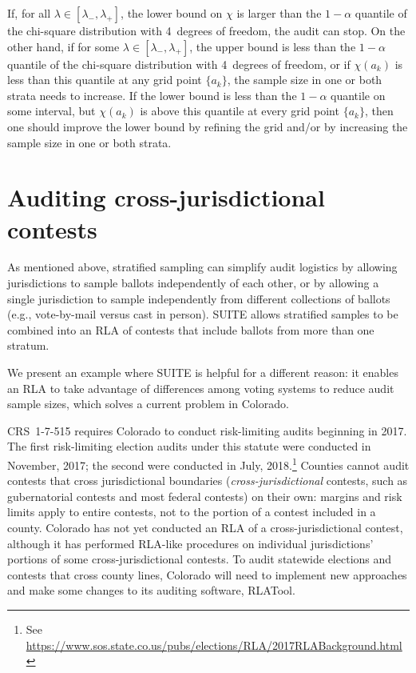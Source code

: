 \documentclass[runningheads]{llncs}
\begin{document}
If, for all $\lambda \in [\lambda_-, \lambda_+]$, the lower bound on $\chi$
is larger than the $1-\alpha$ quantile of the chi-square distribution with 4~degrees of freedom,
the audit can stop.
On the other hand, if for some $\lambda \in [\lambda_-, \lambda_+]$, 
the upper bound is less than the $1-\alpha$ quantile of the chi-square distribution with 4~degrees of freedom, 
or if $\chi(a_k)$ is less than this quantile at any grid point $\{a_k\}$,
the sample size in one or both strata needs to increase.
If the lower bound is less than the $1-\alpha$ quantile on some interval,
but $\chi(a_k)$ is above this quantile at every grid point $\{a_k\}$, then one should improve the lower bound by refining the grid and/or by increasing the sample size in one or both strata.

\section{Auditing cross-jurisdictional contests}\label{sec:combiningMethods}
As mentioned above, stratified sampling can simplify audit logistics by allowing jurisdictions
to sample ballots independently of each other, or by allowing a single jurisdiction to sample 
independently from different collections of ballots (e.g., vote-by-mail versus cast in person).
SUITE allows stratified samples to be combined into an RLA of contests that include ballots from more
than one stratum.

We present an example where SUITE is helpful for a different reason: 
it enables an RLA to take
advantage of differences among voting systems to reduce audit sample sizes, which solves
a current problem in Colorado.

CRS~1-7-515 requires Colorado to conduct risk-limiting audits beginning in 2017.
The first risk-limiting election audits under this statute were conducted in November, 2017; the second were conducted in July, 2018.\footnote{%
 See \url{https://www.sos.state.co.us/pubs/elections/RLA/2017RLABackground.html}
}
Counties cannot audit contests that cross jurisdictional boundaries (\emph{cross-jurisdictional} contests, such as gubernatorial contests and most federal contests)
on their own: margins and risk limits apply to entire contests, not to the portion of a 
contest included in a county.
Colorado has not yet conducted an RLA of a cross-jurisdictional contest, although it has performed RLA-like procedures on individual jurisdictions' portions of some cross-jurisdictional contests.
To audit statewide elections and contests that cross county lines, Colorado will need to implement new approaches and make some changes to its auditing software, RLATool.
\end{document}
